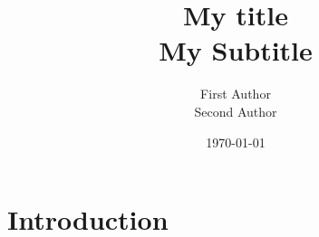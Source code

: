 




\renewcommand\and{\\[\baselineskip]}

\title{My title \\ \Large \normalfont My Subtitle}
\author{First Author \and Second Author}
\date{\today}




    



    \tableofcontents \pagebreak

    \listoffigures \pagebreak
    \listoftables \clearpage



    \setlength{\parskip}{1em plus 0.5em minus 0.2em}

    \section{Introduction}


    \printbibliography[heading=bibintoc]


